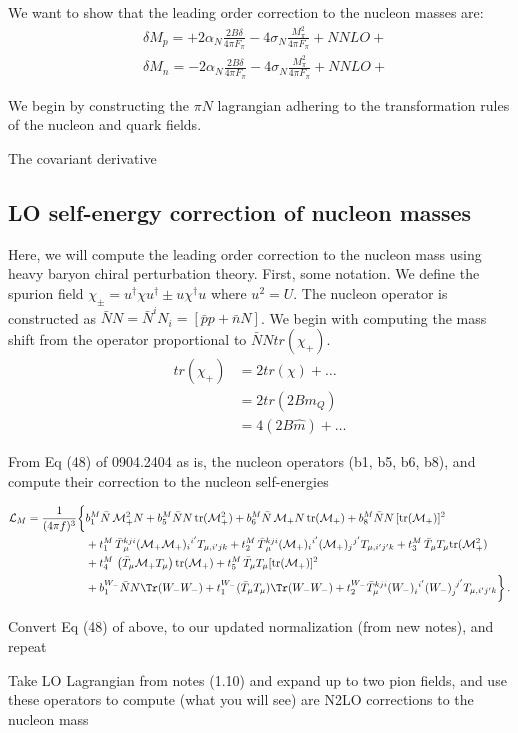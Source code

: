 \documentclass[12pt,tightenlines, raggedbottom, prd, notitlepage]{revtex4-1}
\def\mc#1{{\mathcal #1}}
\def\tr{\text{tr}}
\begin{document}
We want to show that the leading order correction to the nucleon masses are:
\begin{align*}
 &\delta M_p =  +2\alpha_N \frac{2B\delta}{4\pi F_\pi} - 4\sigma_N \frac{M^2_\pi}{4\pi F_\pi} + NNLO+ \\
 &\delta M_n = -2\alpha_N \frac{2B\delta}{4\pi F_\pi} - 4\sigma_N \frac{M^2_\pi}{4\pi F_\pi} + NNLO+
\end{align*}

We begin by constructing the $\pi N$ lagrangian adhering to the transformation rules
of the nucleon and quark fields. 

The covariant derivative 




\subsection*{LO self-energy correction of nucleon masses}

Here, we will compute the leading order correction to the nucleon mass using heavy baryon chiral perturbation theory. First, some notation. We define the spurion field $\chi_{\pm} = u^{\dagger}\chi u^{\dagger} \pm u\chi^{\dagger}u$ where $u^2 = U$.
The nucleon operator is constructed as $\bar{N}N = \bar{N}^iN_i = [\bar{p}p + \bar{n}N]$. We begin with computing the mass shift from the 
operator proportional to $\bar{N}Ntr(\chi_+)$. 
\begin{align*}
tr(\chi_+) &= 2tr(\chi) + \dots \\
&= 2tr(2Bm_Q) \\
&= 4(2B\hat{m}) + \dots
\end{align*}




From Eq (48) of 0904.2404 as is, 
the nucleon operators (b1, b5, b6, b8), and compute their correction to the nucleon self-energies

\begin{align}
  \mc{L}_M = \frac{1}{(4\pi f)^3} \bigg\{&
    b_1^M \bar{N}  \, \mc{M}_+^2  N
      + b_5^M \bar{N} N \, \tr ( \mc{M}_+^2 )
      + b_6^M \bar{N} \, \mc{M}_+ N \, \tr (\mc{M}_+) 
      + b_8^M \bar{N} N \, [\tr (\mc{M}_+)]^2
  \nonumber\\&
    + t_1^M \, \bar{T} {}^{kji}_\mu (\mc{M}_+ \mc{M}_+)_{i}{}^{i'} T_{\mu, i'jk} 
    + t_2^M  \, \bar{T} {}^{kji}_\mu (\mc{M}_+)_{i}{}^{i'} (\mc{M}_+)_{j}{}^{j'} T_{\mu, i'j'k} 
    + t_3^M  \, \bar{T}_\mu T_\mu \tr (\mc{M}_+^2)
  \nonumber\\&			
    + t_4^M \, \left( \bar{T}_\mu \mc{M}_+ T_\mu \right) \tr (\mc{M}_+)
    + t_5^M  \, \bar{T}_\mu T_\mu  [ \tr(\mc{M}_+) ]^2
  \nonumber\\&
    +b_1^{W_-} \bar{N} N \Tr (W_- W_-)
    +t_1^{W_-} (\bar{T}_\mu T_\mu) \Tr (W_- W_-)
    +t_2^{W_-} \bar{T}^{kji}_\mu (W_-)_{i}^{\ i^\prime} (W_-)_{j}^{\ j^\prime} T_{\mu, i^\prime j^\prime k}
    \bigg\}\, .
  \end{align}

Convert Eq (48) of above, to our updated normalization (from new notes), and repeat

Take LO Lagrangian from notes (1.10) and expand up to two pion fields, and use these operators to compute (what you will see) are N2LO corrections to the nucleon mass
\end{document}
